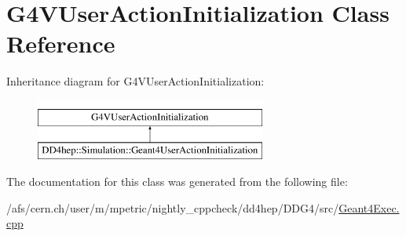 \hypertarget{class_g4_v_user_action_initialization}{}\section{G4\+V\+User\+Action\+Initialization Class Reference}
\label{class_g4_v_user_action_initialization}
Inheritance diagram for G4\+V\+User\+Action\+Initialization\+:\begin{figure}[H]
\begin{center}
\leavevmode
\includegraphics[height=2.000000cm]{class_g4_v_user_action_initialization}
\end{center}
\end{figure}


The documentation for this class was generated from the following file\+:\begin{DoxyCompactItemize}
\item 
/afs/cern.\+ch/user/m/mpetric/nightly\+\_\+cppcheck/dd4hep/\+D\+D\+G4/src/\hyperlink{_geant4_exec_8cpp}{Geant4\+Exec.\+cpp}\end{DoxyCompactItemize}
